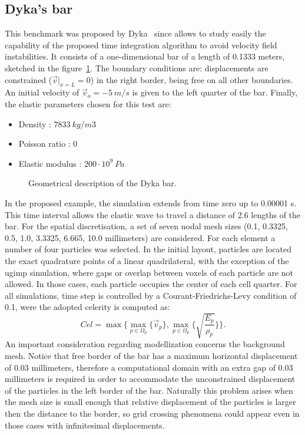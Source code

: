 \documentclass[preprint,12pt,a4paper]{elsarticle}
\begin{document}
\subsection{Dyka's bar \cite{Dyka1995}}
\label{sec:dyka-bar}

This benchmark was proposed by Dyka~\cite{Dyka1995} since allows to study easily the capability
of the proposed time integration algorithm to avoid velocity
field instabilities. It consists of a one-dimensional bar of a length
of 0.1333 meters, sketched in the figure~\ref{fig:Dyka_Bar}. The
boundary conditions are: displacements are constrained ($\vec{v}
\rvert_{x=L} = 0$) in the right border, being free on all other boundaries. An initial velocity of $\vec{v}_o = - 5\ m/s$ is given to the
left quarter of the bar. Finally, the elastic parameters chosen for this test are:
\begin{itemize} 
\item  Density : $7833\ kg/m3$
\item  Poisson ratio : $0$
\item  Elastic modulus : $200 \cdot 10^9\ Pa$
\end{itemize}
\begin{figure}
  \centering
  \resizebox{\hsize}{!}{
    }
  \caption{Geometrical description of the Dyka \cite{Dyka1995} bar.}
  \label{fig:Dyka_Bar}
\end{figure}
In the proposed example, the simulation extends from time zero up to 0.00001 s.
This time interval allows the elastic wave to travel a distance of 2.6
lengths of the bar. For the spatial
discretisation, a set of seven nodal mesh sizes (0.1, 0.3325, 0.5,
1.0, 3.3325, 6.665, 10.0 millimeters) are considered. For each element a number of
four particles was selected. In the initial layout, particles are located the exact quadrature points of a linear quadrilateral, with
the exception of the \acrshort{ugimp} simulation, where gaps or overlap between
voxels of each particle are not allowed. In those cases, each particle
occupies the center of each cell quarter. For all simulations, time step
is controlled by a Courant-Friedrichs-Levy condition of 0.1, were the adopted
celerity is computed as:
\begin{equation}
  \label{eq:Cel}
  Cel = \max\{\max_{p \in \Omega_p}\{ \vec{v}_p \} , \max_{p \in \Omega_p}\{ \sqrt{\frac{E_p}{\rho_p}} \} \}.
\end{equation}
An important consideration regarding modellization concerns the
background mesh. Notice that free border of the bar has a maximum
horizontal displacement of 0.03 millimeters, therefore 
a computational domain with an extra gap of 0.03 millimeters is
required in order to accommodate the unconstrained displacement of the
particles in the left border of the bar. Naturally this problem arises
when the mesh size is small enough that relative displacement of the
particles is larger then the distance to the border, so grid crossing
phenomena could appear even in those cases with infinitesimal
displacements.
\end{document}
